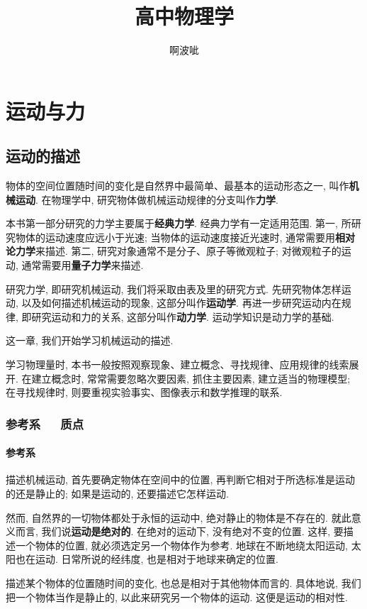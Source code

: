\documentclass[UTF8,openany,fontset=fandol]{ctexbook}
\title{高中物理学}
\author{啊波呲}
\theoremstyle{chinesetextbook}
\newcommand{\bre}{\ \ \ }
\begin{document}
\frontmatter
\maketitle
\tableofcontents
\mainmatter
\part{运动与力}
\chapter{运动的描述}
物体的空间位置随时间的变化是自然界中最简单、最基本的运动形态之一, 叫作\textbf{机械运动}. 在物理学中, 研究物体做机械运动规律的分支叫作\textbf{力学}.

本书第一部分研究的力学主要属于\textbf{经典力学}. 经典力学有一定适用范围. 第一, 所研究物体的运动速度应远小于光速; 当物体的运动速度接近光速时, 通常需要用\textbf{相对论力学}来描述. 第二, 研究对象通常不是分子、原子等微观粒子; 对微观粒子的运动, 通常需要用\textbf{量子力学}来描述.

研究力学, 即研究机械运动, 我们将采取由表及里的研究方式. 先研究物体怎样运动, 以及如何描述机械运动的现象, 这部分叫作\textbf{运动学}. 再进一步研究运动内在规律, 即研究运动和力的关系, 这部分叫作\textbf{动力学}. 运动学知识是动力学的基础.

这一章, 我们开始学习机械运动的描述.

学习物理量时, 本书一般按照观察现象、建立概念、寻找规律、应用规律的线索展开. 在建立概念时, 常常需要忽略次要因素, 抓住主要因素, 建立适当的物理模型; 在寻找规律时, 则要重视实验事实、图像表示和数学推理的联系.
\section{参考系\bre 质点}
\subsection{参考系}
描述机械运动, 首先要确定物体在空间中的位置, 再判断它相对于所选标准是运动的还是静止的; 如果是运动的, 还要描述它怎样运动.

然而, 自然界的一切物体都处于永恒的运动中, 绝对静止的物体是不存在的. 就此意义而言, 我们说\textbf{运动是绝对的}. 在绝对的运动下, 没有绝对不变的位置. 这样, 要描述一个物体的位置, 就必须选定另一个物体作为参考. 地球在不断地绕太阳运动, 太阳也在运动. 日常所说的经纬度, 也是相对于地球来确定的位置.

描述某个物体的位置随时间的变化, 也总是相对于其他物体而言的. 具体地说, 我们把一个物体当作是静止的, 以此来研究另一个物体的运动. 这便是运动的相对性.
\end{document}
